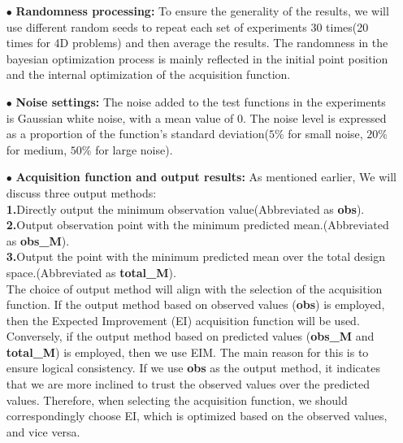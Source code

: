 \documentclass{article}
\begin{document}
\begin{itemize}[itemsep=4pt,topsep=0pt,parsep=0pt]
\item[$\bullet$] \textbf{Randomness processing:} To ensure the generality of the results, we will use different random seeds to repeat each set of experiments 30 times(20 times for 4D problems) and then average the results. The randomness in the bayesian optimization process is mainly reflected in the initial point position and the internal optimization of the acquisition function.
\item[$\bullet$] \textbf{Noise settings:} The noise added to the test functions in the experiments is Gaussian white noise, with a mean value of 0. The noise level is expressed as a proportion of the function's standard deviation($5\%$ for small noise, $20\%$ for medium, $50\%$ for large noise).
\item[$\bullet$] \textbf{Acquisition function and output results:} As mentioned earlier, We will discuss three output methods: \\
\textbf{1.}Directly output the minimum observation value(Abbreviated as \textbf{obs}).\\
\textbf{2.}Output observation point with the minimum predicted mean.(Abbreviated as \textbf{obs\_M}).\\
\textbf{3.}Output the point with the minimum predicted mean over the total design space.(Abbreviated as \textbf{total\_M}).\\
The choice of output method will align with the selection of the acquisition function. If the output method based on observed values (\textbf{obs}) is employed, then the Expected Improvement (EI) acquisition function will be used. Conversely, if the output method based on predicted values (\textbf{obs\_M} and \textbf{total\_M}) is employed, then we use EIM. The main reason for this is to ensure logical consistency. If we use \textbf{obs} as the output method, it indicates that we are more inclined to trust the observed values over the predicted values. Therefore, when selecting the acquisition function, we should correspondingly choose EI, which is optimized based on the observed values, and vice versa.

\end{itemize}
\end{document}
